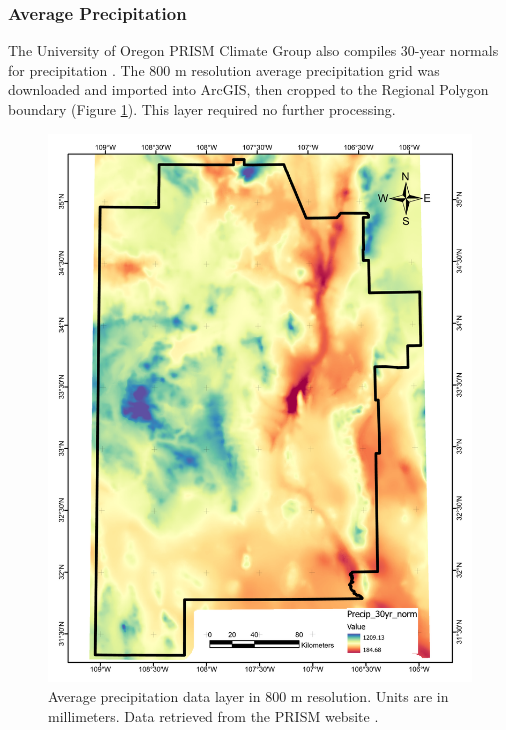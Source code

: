 \subsubsection{Average Precipitation}

The University of Oregon PRISM Climate Group also compiles 30-year normals for precipitation \citep{daly_physiographically_2008, prism_prism_2021}. The 800 m resolution average precipitation grid was downloaded and imported into ArcGIS, then cropped to the Regional Polygon boundary (Figure \ref{fig:feat_precip}). This layer required no further processing.

\begin{figure}[!htp]
\centering
\includegraphics[scale=.50]{templates/images/Figure-AvgPrecip.pdf}
\caption[Average precipitation data layer]{Average precipitation data layer in 800 m resolution. Units are in millimeters. Data retrieved from the PRISM website \protect\citep{prism_prism_2021}.}
\label{fig:feat_precip}
\end{figure}

